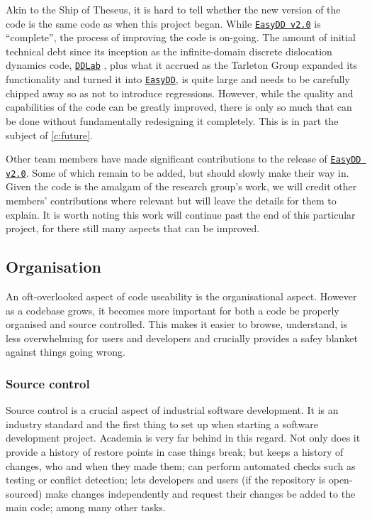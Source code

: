 Akin to the Ship of Theseus, it is hard to tell whether the new version of the code is the same code as when this project began. While \href{https://github.com/TarletonGroup/EasyDD}{\texttt{EasyDD v2.0}} is ``complete'', the process of improving the code is on-going. The amount of initial technical debt since its inception as the infinite-domain discrete dislocation dynamics code, \href{http://micro.stanford.edu/wiki/Main_Page}{\texttt{DDLab}} \cite{ddlab}, plus what it accrued as the Tarleton Group expanded its functionality and turned it into \href{https://github.com/TarletonGroup/EasyDD/tree/65907b022d1fe408fc1b2e5c5ca2bd1797ccae04}{\texttt{EasyDD}}, is quite large and needs to be carefully chipped away so as not to introduce regressions. However, while the quality and capabilities of the code can be greatly improved, there is only so much that can be done without fundamentally redesigning it completely. This is in part the subject of \cref{c:future}.

Other team members have made significant contributions to the release of \href{https://github.com/TarletonGroup/EasyDD}{\texttt{EasyDD v2.0}}. Some of which remain to be added, but should slowly make their way in. Given the code is the amalgam of the research group's work, we will credit other members' contributions where relevant but will leave the details for them to explain. It is worth noting this work will continue past the end of this particular project, for there still many aspects that can be improved.

\subsection{Organisation}

An oft-overlooked aspect of code useability is the organisational aspect. However as a codebase grows, it becomes more important for both a code be properly organised and source controlled. This makes it easier to browse, understand, is less overwhelming for users and developers and crucially provides a safey blanket against things going wrong.

\subsubsection{Source control}

Source control is a crucial aspect of industrial software development. It is an industry standard and the first thing to set up when starting a software development project. Academia is very far behind in this regard. Not only does it provide a history of restore points in case things break; but keeps a history of changes, who and when they made them; can perform automated checks such as testing or conflict detection; lets developers and users (if the repository is open-sourced) make changes independently and request their changes be added to the main code; among many other tasks.

